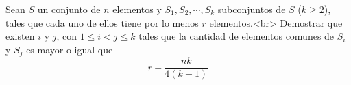 Sean $S$ un conjunto de $n$ elementos y $S_1, S_2, \cdots , S_k$ subconjuntos de $S$ ($k \geq 2$), tales que cada uno de ellos tiene por lo menos $r$ elementos.<br>
Demostrar que existen $i$ y $j$, con $1 \leq i < j \leq k$ tales que la cantidad de elementos comunes de $S_i$ y $S_j$ es mayor o igual que
\[ r - \frac{nk}{4(k-1)} \]
